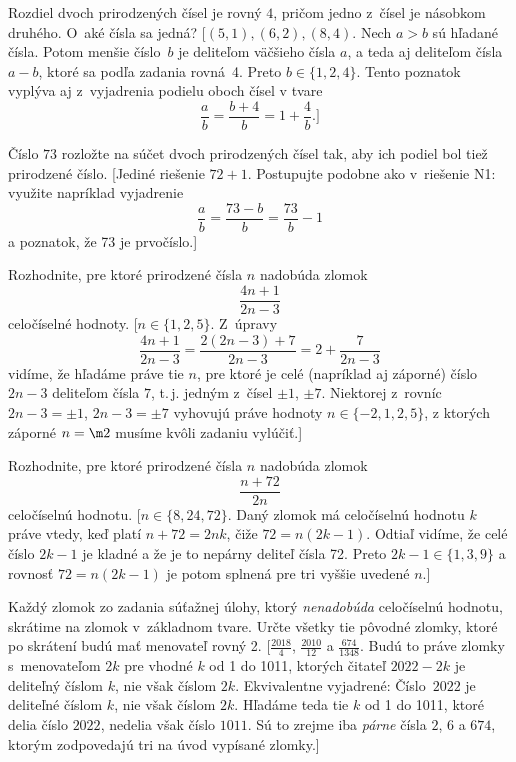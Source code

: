 {
Rozdiel dvoch prirodzených čísel je rovný $4$, pričom jedno
z~čísel je násobkom druhého. O~aké čísla sa jedná?
[$(5,1), (6,2), (8,4)$. Nech $a>b$ sú hľadané čísla. Potom
menšie číslo~$b$ je deliteľom väčšieho čísla $a$,
a teda aj deliteľom čísla $a-b$, ktoré sa podľa zadania rovná~4.
Preto $b\in\{1,2,4\}$. Tento poznatok vyplýva aj
z~vyjadrenia podielu oboch čísel v tvare
$$\frac{a}{b}=\frac{b+4}{b}=1+\frac{4}{b}.]
$$

Číslo $73$ rozložte na súčet dvoch prirodzených čísel tak,
aby ich podiel bol tiež prirodzené číslo.
[Jediné riešenie $72+1$. Postupujte podobne ako v~riešenie N1: využite
napríklad vyjadrenie $$\frac{a}{b}=\frac{73-b}{b}=\frac{73}{b}-1
$$
a poznatok, že 73 je prvočíslo.]

Rozhodnite, pre ktoré prirodzené čísla $n$ nadobúda zlomok
$$
\frac{4n+1}{2n-3}
$$
celočíselné hodnoty.
[$n\in\{1,2,5\}$. Z~úpravy
$$
\frac{4n+1}{2n-3}=\frac{2(2n-3)+7}{2n-3}=2+\frac{7}{2n-3}
$$
vidíme, že hľadáme práve tie $n$, pre ktoré je
celé (napríklad aj záporné) číslo $2n-3$ deliteľom čísla $7$,
t.\,j. jedným z~čísel $\pm 1$, $\pm 7$. Niektorej z~rovníc $2n-3=\pm1$, $2n-3=\pm7$
vyhovujú práve hodnoty $n\in \{-2,1,2,5\}$, z ktorých záporné $n=\m2$
musíme kvôli zadaniu vylúčiť.]

\D
Rozhodnite, pre ktoré prirodzené čísla $n$ nadobúda zlomok
$$
\frac{n+72}{2n}
$$
celočíselnú hodnotu.
[$n\in\{8,24,72\}$. Daný zlomok má celočíselnú hodnotu $k$
práve vtedy, keď platí $n+72=2nk$, čiže $72=n(2k-1)$. Odtiaľ vidíme, že
celé číslo $2k-1$ je kladné a že je to nepárny deliteľ čísla 72. Preto
$2k-1\in\{1,3,9\}$ a rovnosť $72=n(2k-1)$ je potom splnená pre tri
vyššie uvedené $n$.]

Každý zlomok zo zadania súťažnej úlohy, ktorý {\it nenadobúda\/}
celočíselnú hodnotu, skrátime na zlomok v~základnom tvare. Určte
všetky tie pôvodné zlomky, ktoré po skrátení budú mať
menovateľ rovný 2.
[$\frac{2018}{4}$, $\frac{2010}{12}$ a $\frac{674}{1348}$.
Budú to práve zlomky s~menovateľom $2k$
pre vhodné $k$ od 1 do 1011, ktorých čitateľ $2022-2k$ je
deliteľný číslom $k$, nie však číslom $2k$. Ekvivalentne vyjadrené:
Číslo~$2022$ je deliteľné číslom $k$, nie však číslom $2k$.
Hľadáme teda tie $k$ od 1 do 1011, ktoré delia číslo
$2022$, nedelia však číslo $1011$. Sú to zrejme iba {\it
párne\/} čísla $2$, $6$ a $674$, ktorým zodpovedajú
tri na úvod vypísané zlomky.]
}

